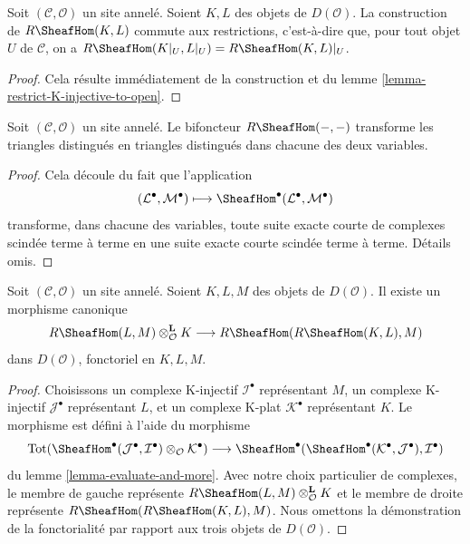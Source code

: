 \begin{lemma}
\label{lemma-restriction-RHom-to-U}
Soit $(\mathcal{C}, \mathcal{O})$ un site annelé. Soient $K, L$ des objets
de $D(\mathcal{O})$. La construction de $R\SheafHom(K, L)$
commute aux restrictions, c'est-à-dire que,
pour tout objet $U$ de $\mathcal{C}$, on a
$R\SheafHom(K|_U, L|_U) = R\SheafHom(K, L)|_U$.
\end{lemma}

\begin{proof}
Cela résulte immédiatement de la construction et du
lemme \ref{lemma-restrict-K-injective-to-open}.
\end{proof}

\begin{lemma}
\label{lemma-RHom-triangulated}
Soit $(\mathcal{C}, \mathcal{O})$ un site annelé. Le bifoncteur
$R\SheafHom(- , -)$ transforme les triangles distingués en
triangles distingués dans chacune des deux variables.
\end{lemma}

\begin{proof}
Cela découle du fait que l'application
$$
(\mathcal{L}^\bullet, \mathcal{M}^\bullet) \longmapsto
\SheafHom^\bullet(\mathcal{L}^\bullet, \mathcal{M}^\bullet)
$$
transforme, dans chacune des variables, toute suite exacte courte de complexes
scindée terme à terme en une suite exacte courte scindée terme à terme. Détails omis.
\end{proof}

\begin{lemma}
\label{lemma-internal-hom-evaluate}
Soit $(\mathcal{C}, \mathcal{O})$ un site annelé. Soient $K, L, M$ des objets
de $D(\mathcal{O})$. Il existe un morphisme canonique
$$
R\SheafHom(L, M) \otimes_\mathcal{O}^\mathbf{L} K
\longrightarrow
R\SheafHom(R\SheafHom(K, L), M)
$$
dans $D(\mathcal{O})$, fonctoriel en $K, L, M$.
\end{lemma}

\begin{proof}
Choisissons un complexe K-injectif $\mathcal{I}^\bullet$ représentant $M$,
un complexe K-injectif $\mathcal{J}^\bullet$ représentant $L$, et un complexe
K-plat $\mathcal{K}^\bullet$ représentant $K$. Le morphisme est défini à
l'aide du morphisme
$$
\text{Tot}(\SheafHom^\bullet(\mathcal{J}^\bullet,
\mathcal{I}^\bullet) \otimes_\mathcal{O} \mathcal{K}^\bullet)
\longrightarrow
\SheafHom^\bullet(\SheafHom^\bullet(\mathcal{K}^\bullet,
\mathcal{J}^\bullet), \mathcal{I}^\bullet)
$$
du lemme \ref{lemma-evaluate-and-more}. Avec notre choix particulier de
complexes, le membre de gauche représente
$R\SheafHom(L, M) \otimes_\mathcal{O}^\mathbf{L} K$
et le membre de droite représente
$R\SheafHom(R\SheafHom(K, L), M)$. Nous omettons la démonstration de la
fonctorialité par rapport aux trois objets de $D(\mathcal{O})$.
\end{proof}

